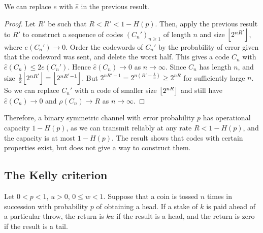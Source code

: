 \begin{proposition}
    We can replace \( e \) with \( \hat e \) in the previous result.
\end{proposition}
\begin{proof}
    Let \( R' \) be such that \( R < R' < 1 - H(p) \).
    Then, apply the previous result to \( R' \) to construct a sequence of codes \( (C_n')_{n \geq 1} \) of length \( n \) and size \( \floor*{2^{nR'}} \), where \( e(C_n') \to 0 \).
    Order the codewords of \( C_n' \) by the probability of error given that the codeword was sent, and delete the worst half.
    This gives a code \( C_n \) with \( \hat e(C_n) \leq 2 e(C_n') \).
    Hence \( \hat e(C_n) \to 0 \) as \( n \to \infty \).
    Since \( C_n \) has length \( n \), and size \( \frac{1}{2} \floor*{2^{nR'}} = \floor*{2^{nR' - 1}} \).
    But \( 2^{nR' - 1} = 2^{n(R' - \frac{1}{n})} \geq 2^{nR} \) for sufficiently large \( n \).
    So we can replace \( C_n' \) with a code of smaller size \( \floor*{2^{nR}} \) and still have \( \hat e(C_n) \to 0 \) and \( \rho(C_n) \to R \) as \( n \to \infty \).
\end{proof}
Therefore, a binary symmetric channel with error probability \( p \) has operational capacity \( 1 - H(p) \), as we can transmit reliably at any rate \( R < 1 - H(p) \), and the capacity is at most \( 1 - H(p) \).
The result shows that codes with certain properties exist, but does not give a way to construct them.

\subsection{The Kelly criterion}
Let \( 0 < p < 1 \), \( u > 0 \), \( 0 \leq w < 1 \).
Suppose that a coin is tossed \( n \) times in succession with probability \( p \) of obtaining a head.
If a stake of \( k \) is paid ahead of a particular throw, the return is \( ku \) if the result is a head, and the return is zero if the result is a tail.

